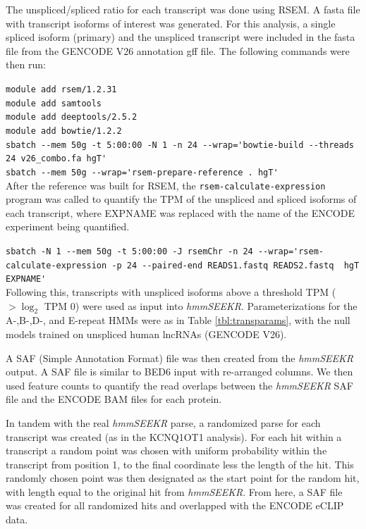 The unspliced/spliced ratio for each transcript was done using RSEM. A fasta file with transcript isoforms of interest was generated. For this analysis, a single spliced isoform (primary) and the unspliced transcript were included in the fasta file from the GENCODE V26 annotation gff file. The following commands were then run: 

\lstinline{module add rsem/1.2.31}\\
\lstinline{module add samtools}\\
\lstinline{module add deeptools/2.5.2}\\
\lstinline{module add bowtie/1.2.2}\\
\lstinline{sbatch --mem 50g -t 5:00:00 -N 1 -n 24 --wrap='bowtie-build --threads 24 v26_combo.fa hgT'}\\
\lstinline{sbatch --mem 50g --wrap='rsem-prepare-reference . hgT'}\\    


After the reference was built for RSEM, the \texttt{rsem-calculate-expression} program was called to quantify the TPM of the unspliced and spliced isoforms of each transcript, where EXPNAME was replaced with the name of the ENCODE experiment being quantified. 

\lstinline{sbatch -N 1 --mem 50g -t 5:00:00 -J rsemChr -n 24 --wrap='rsem-calculate-expression -p 24 --paired-end READS1.fastq READS2.fastq  hgT EXPNAME'}\\

Following this, transcripts with unspliced isoforms above a threshold TPM ($> \log_2$ TPM 0) were used as input into \emph{hmmSEEKR}. Parameterizations for the A-,B-,D-, and E-repeat HMMs were as in Table \ref{tbl:transparams}, with the null models trained on unspliced human lncRNAs (GENCODE V26).  

A SAF (Simple Annotation Format) file was then created from the \emph{hmmSEEKR} output. A SAF file is similar to BED6 input with re-arranged columns. We then used feature counts to quantify the read overlaps between the \emph{hmmSEEKR} SAF file and the ENCODE BAM files for each protein. 

In tandem with the real \emph{hmmSEEKR} parse, a randomized parse for each transcript was created (as in the KCNQ1OT1 analysis). For each hit within a transcript a random point was chosen with uniform probability within the transcript from position 1, to the final coordinate less the length of the hit. This randomly chosen point was then designated as the start point for the random hit, with length equal to the original hit from \emph{hmmSEEKR}. From here, a SAF file was created for all randomized hits and overlapped with the ENCODE eCLIP data. 

